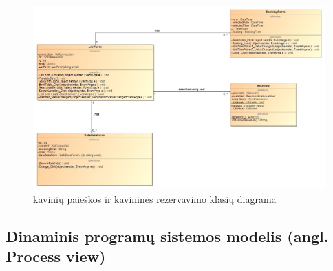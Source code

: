 \documentclass{VUMIFPSkursinis}
\begin{document}
\begin{figure}[H]
    \centering
    \includegraphics[width=\textwidth,height=\textheight,keepaspectratio]{img/LoginForm_Address_Booking} 
    \caption{kavinių paieškos ir kavininės rezervavimo klasių diagrama}
    \label{img:LoginForm_Address_Booking}
\end{figure}

\subsection{Dinaminis programų sistemos modelis (angl. Process view)}
\end{document}
